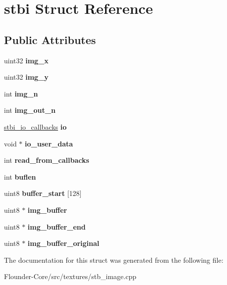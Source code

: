 \hypertarget{structstbi}{}\section{stbi Struct Reference}
\label{structstbi}
\subsection*{Public Attributes}
\begin{DoxyCompactItemize}
\item 
\mbox{\label{structstbi_af3b42c257fb0d8896f29ca3921540a42}} 
uint32 {\bfseries img\+\_\+x}
\item 
\mbox{\label{structstbi_a60cb5a630e268b2d12306c6eca246dd1}} 
uint32 {\bfseries img\+\_\+y}
\item 
\mbox{\label{structstbi_ae22cfcc23f5ab67bede22942333ecbd7}} 
int {\bfseries img\+\_\+n}
\item 
\mbox{\label{structstbi_a33f6519d8f99b84afbde795dc7a931f2}} 
int {\bfseries img\+\_\+out\+\_\+n}
\item 
\mbox{\label{structstbi_a86596e1eb2b0f57a60a18777bd37ff53}} 
\hyperlink{structstbi__io__callbacks}{stbi\+\_\+io\+\_\+callbacks} {\bfseries io}
\item 
\mbox{\label{structstbi_a9838a0c89630f283c25a16f4e30f40aa}} 
void $\ast$ {\bfseries io\+\_\+user\+\_\+data}
\item 
\mbox{\label{structstbi_acb201cc1b3eb134f342cee89f5d11e70}} 
int {\bfseries read\+\_\+from\+\_\+callbacks}
\item 
\mbox{\label{structstbi_a76d6f761529ecff7f02469b19371af0e}} 
int {\bfseries buflen}
\item 
\mbox{\label{structstbi_af99edda496281a6ca1b58271cabdbc69}} 
uint8 {\bfseries buffer\+\_\+start} \mbox{[}128\mbox{]}
\item 
\mbox{\label{structstbi_aace36d5487a596bea5faa0aef0398ac8}} 
uint8 $\ast$ {\bfseries img\+\_\+buffer}
\item 
\mbox{\label{structstbi_a55f78565e605f1784d47fc9acea475f3}} 
uint8 $\ast$ {\bfseries img\+\_\+buffer\+\_\+end}
\item 
\mbox{\label{structstbi_a261be6edda817862e623972b21b4f965}} 
uint8 $\ast$ {\bfseries img\+\_\+buffer\+\_\+original}
\end{DoxyCompactItemize}


The documentation for this struct was generated from the following file\+:\begin{DoxyCompactItemize}
\item 
Flounder-\/\+Core/src/textures/stb\+\_\+image.\+cpp\end{DoxyCompactItemize}
